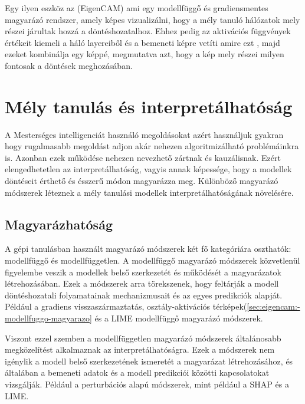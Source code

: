 \documentclass[12pt,oneside,a4paper]{article}
\newcommand{\newsection}[1]{\clearpage\section{#1}}\label{makro}
\theoremstyle{remark}
\begin{document}
    Egy ilyen eszköz az  (\gls{EigenCAM}) ami egy modellfüggő és gradiensmentes magyarázó rendszer,
    amely képes vizualizálni, hogy a mély tanuló hálózatok mely részei járultak hozzá a döntéshozatalhoz.
    Ehhez pedig
    az aktivációs függvények értékeit kiemeli a háló layereiből és a bemeneti képre vetíti amire ezt , majd ezeket kombinálja
    egy képpé, megmutatva azt, hogy a kép mely részei milyen fontosak a döntések meghozásában.

\newsection{Mély tanulás és interpretálhatóság}\label{sec:mely-tanulas-es-interpretalhatosag}
A Mesterséges intelligenciát használó megoldásokat azért használjuk gyakran hogy rugalmasabb megoldást adjon akár
nehezen algoritmizálható problémáinkra is.
Azonban ezek működése nehezen nevezhető zártnak és kauzálisnak.
 Ezért elengedhetetlen az interpretálhatóság, vagyis annak képessége, hogy a modellek
döntéseit érthető és ésszerű módon magyarázza meg.
    Különböző magyarázó módszerek léteznek a mély tanulási modellek interpretálhatóságának növelésére.
\subsection{Magyarázhatóság}
A gépi tanulásban használt magyarázó módszerek két fő kategóriára oszthatók: modellfüggő és modellfüggetlen. A modellfüggő magyarázó módszerek közvetlenül figyelembe veszik a modellek belső szerkezetét és működését a magyarázatok létrehozásában. Ezek a módszerek arra törekszenek, hogy feltárják a modell döntéshozatali folyamatainak mechanizmusait és az egyes predikciók alapját. Például a gradiens visszaszármaztatás, osztály-aktivációs térképek(\ref{sec:eigencam:-modellfuggo-magyarazo}\label{sechiv} és a LIME modellfüggő magyarázó módszerek.

Viszont ezzel szemben a modellfüggetlen magyarázó módszerek általánosabb megközelítést alkalmaznak az interpretálhatóságra. Ezek a módszerek nem igénylik a modell belső szerkezetének ismeretét a magyarázat létrehozásához, és általában a bemeneti adatok és a modell predikciói közötti kapcsolatokat vizsgálják. Például a perturbációs alapú módszerek, mint például a SHAP és a LIME.
\end{document}
